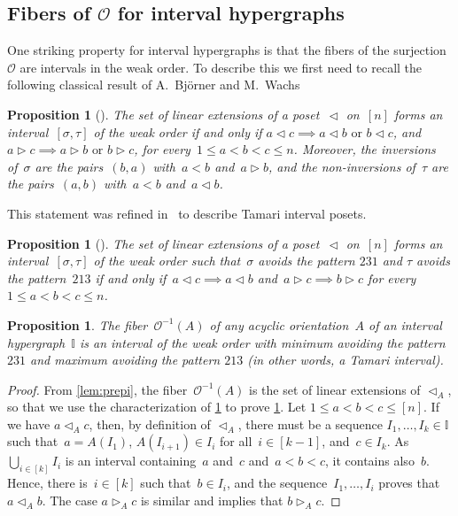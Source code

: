 \documentclass{amsart}
\newtheorem{proposition}[theorem]{Proposition}
\theoremstyle{definition}
\newcommand{\less}{\vartriangleleft} %
\newcommand{\more}{\vartriangleright} %
\newcommand{\Or}{\mathcal O}  %
\newcommand{\II}{\mathbb I} %
\begin{document}

\subsection{Fibers of $\Or$ for interval hypergraphs} 
\label{subsec:preimageI}

One striking property for interval hypergraphs is that the fibers of the surjection~$\Or$ are intervals in the weak order.
To describe this we first need to recall the following classical result of A.~Bj\"orner and M.~Wachs~\cite[Thm.~6.8]{BjornerWachs}

\begin{proposition}[{\cite[Thm.~6.8]{BjornerWachs}}]
\label{prop:WOIP}
The set of linear extensions of a poset~$\less$ on~$[n]$ forms an interval~$[\sigma, \tau]$ of the weak order if and only if ${a \less c \implies a \less b \text{ or } b \less c}$, and~${a \more c \implies a \more b \text{ or } b \more c}$, for every~$1 \le a < b < c \le n$.
Moreover, the inversions of~$\sigma$ are the pairs~$(b,a)$ with~$a < b$ and~$a \more b$, and the non-inversions of~$\tau$ are the pairs~$(a,b)$ with~$a < b$ and~$a \less b$.
\end{proposition}

This statement was refined in~\cite{ChatelPilaudPons} to describe Tamari interval posets.

\begin{proposition}[{\cite[Coro.~2.24]{ChatelPilaudPons}}]
\label{prop:TOIP}
The set of linear extensions of a poset~$\less$ on~$[n]$ forms an interval~$[\sigma, \tau]$ of the weak order such that~$\sigma$ avoids the pattern $231$ and $\tau$ avoids the pattern~$213$ if and only if~${a \less c \implies a \less b}$ and~$a \more c \implies b \more c$ for every~$1 \le a < b < c \le n$.
\end{proposition}

\begin{proposition}
\label{prop:preimageI}
The fiber~$\Or^{-1}(A)$ of any acyclic orientation~$A$ of an interval hypergraph~$\II$ is an interval of the weak order with minimum avoiding the pattern $231$ and maximum avoiding the pattern $213$ (in other words, a Tamari interval).
\end{proposition}

\begin{proof}
From \cref{lem:prepi}, the fiber~$\Or^{-1}(A)$ is the set of linear extensions of $\less_A$, so that we use the characterization of \cref{prop:TOIP} to prove \cref{prop:preimageI}.
Let $1 \le a < b < c \le [n]$.
If we have $a \less_{A} c$, then, by definition of $\less_A$, there must be a sequence $I_1, \dots, I_k \in \II$ such that~$a = A(I_1)$, $A(I_{i+1}) \in I_i$ for all~$i \in [k-1]$, and~$c \in I_k$.
As $\bigcup_{i \in [k]} I_i$ is an interval containing~$a$ and~$c$ and~$a < b < c$, it contains also~$b$.
Hence, there is~$i \in [k]$ such that~$b \in I_i$, and the sequence~$I_1, \dots, I_i$ proves that~$a \less_{A} b$.
The case $a \more_{A} c$ is similar and  implies that $b \more_A c$.
\end{proof}
\end{document}
